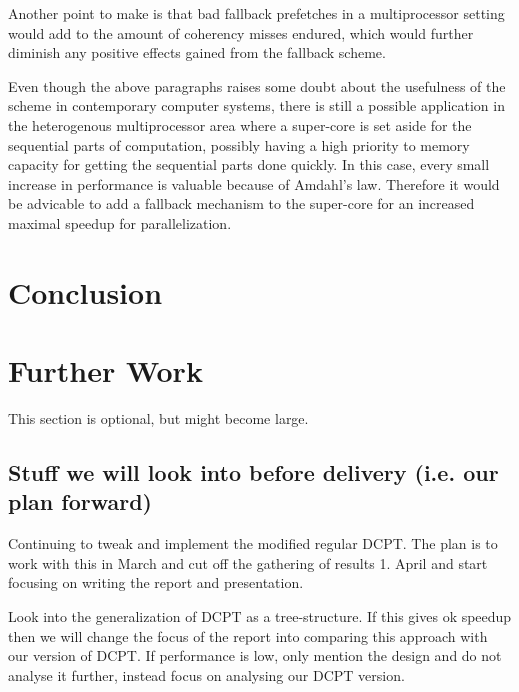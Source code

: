 \documentclass[12pt,journal,compsoc]{IEEEtran}
\begin{document}
Another point to make is that bad fallback prefetches in a
multiprocessor setting would add to the amount of coherency
misses endured, which would further diminish any positive
effects gained from the fallback scheme.

Even though the above paragraphs raises some doubt about
the usefulness of the scheme in contemporary computer systems,
there is still a possible application in the heterogenous
multiprocessor area where a super-core is set aside for the
sequential parts of computation, possibly having a high priority
to memory capacity for getting the sequential parts done quickly.
In this case, every small increase in performance is valuable
because of Amdahl's law. Therefore it would be advicable to add
a fallback mechanism to the super-core for an increased maximal
speedup for parallelization.

\section{Conclusion}

\section{Further Work}
This section is optional, but might become large.

\subsection{Stuff we will look into before delivery (i.e. our plan forward)}
Continuing to tweak and implement the modified regular DCPT. The plan is
to work with this in March and cut off the gathering of results 1. April
and start focusing on writing the report and presentation.

Look into the generalization of DCPT as a tree-structure. If this gives
ok speedup then we will change the focus of the report into comparing this
approach with our version of DCPT. If performance is low, only mention the
design and do not analyse it further, instead focus on analysing our
DCPT version.
\end{document}
